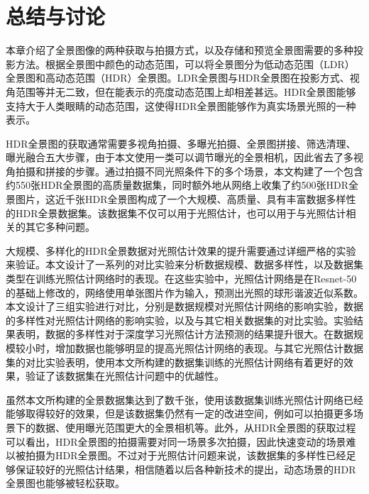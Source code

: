 \section{总结与讨论}
本章介绍了全景图像的两种获取与拍摄方式，以及存储和预览全景图需要的多种投影方法。根据全景图中颜色的动态范围，可以将全景图分为低动态范围（LDR）全景图和高动态范围（HDR）全景图。LDR全景图与HDR全景图在投影方式、视角范围等并无二致，但在能表示的亮度动态范围上却相差甚远。HDR全景图能够支持大于人类眼睛的动态范围，这使得HDR全景图能够作为真实场景光照的一种表示。

HDR全景图的获取通常需要多视角拍摄、多曝光拍摄、全景图拼接、筛选清理、曝光融合五大步骤，由于本文使用一类可以调节曝光的全景相机，因此省去了多视角拍摄和拼接的步骤。通过拍摄不同光照条件下的多个场景，本文构建了一个包含约550张HDR全景图的高质量数据集，同时额外地从网络上收集了约500张HDR全景图片，这近千张HDR全景图构成了一个大规模、高质量、具有丰富数据多样性的HDR全景数据集。该数据集不仅可以用于光照估计，也可以用于与光照估计相关的其它多种问题。

大规模、多样化的HDR全景数据对光照估计效果的提升需要通过详细严格的实验来验证。本文设计了一系列的对比实验来分析数据规模、数据多样性，以及数据集类型在训练光照估计网络时的表现。在这些实验中，光照估计网络是在Resnet-50的基础上修改的，网络使用单张图片作为输入，预测出光照的球形谐波近似系数。本文设计了三组实验进行对比，分别是数据规模对光照估计网络的影响实验，数据的多样性对光照估计网络的影响实验，以及与其它相关数据集的对比实验。实验结果表明，数据的多样性对于深度学习光照估计方法预测的结果提升很大。在数据规模较小时，增加数据也能够明显的提高光照估计网络的表现。与其它光照估计数据集的对比实验表明，使用本文所构建的数据集训练的光照估计网络有着更好的效果，验证了该数据集在光照估计问题中的优越性。

虽然本文所构建的全景数据集达到了数千张，使用该数据集训练光照估计网络已经能够取得较好的效果，但是该数据集仍然有一定的改进空间，例如可以拍摄更多场景下的数据、使用曝光范围更大的全景相机等。此外，从HDR全景图的获取过程可以看出，HDR全景图的拍摄需要对同一场景多次拍摄，因此快速变动的场景难以被拍摄为HDR全景图。不过对于光照估计问题来说，该数据集的多样性已经足够保证较好的光照估计结果，相信随着以后各种新技术的提出，动态场景的HDR全景图也能够被轻松获取。